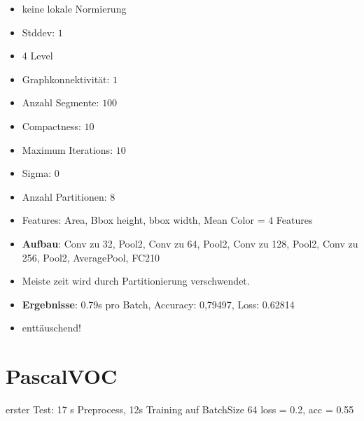 \begin{itemize}
  \item keine lokale Normierung
  \item Stddev: $1$
  \item 4 Level
  \item Graphkonnektivität: $1$
  \item Anzahl Segmente: $100$
  \item Compactness: $10$
  \item Maximum Iterations: $10$
  \item Sigma: $0$
  \item Anzahl Partitionen: 8
  \item Features: Area, Bbox height, bbox width, Mean Color = $4$ Features
  \item \textbf{Aufbau}: Conv zu 32, Pool2, Conv zu 64, Pool2, Conv zu 128, Pool2, Conv zu 256, Pool2, AveragePool, FC210
  \item Meiste zeit wird durch Partitionierung verschwendet.
  \item \textbf{Ergebnisse}: 0.79s pro Batch, Accuracy: 0,79497, Loss: 0.62814
  \item enttäuschend!
\end{itemize}

\section{PascalVOC}

erster Test:
17 s Preprocess, 12s Training auf BatchSize 64
loss = 0.2, acc = 0.55

